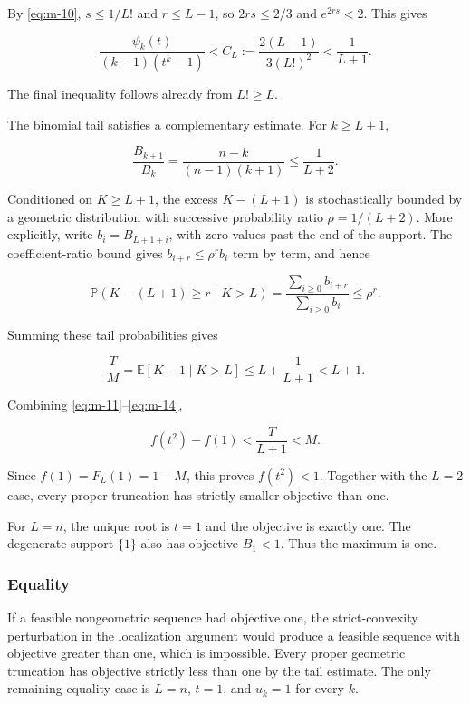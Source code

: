 \documentclass[11pt,a4paper]{article}
\theoremstyle{definition}
\theoremstyle{remark}
\begin{document}
By \eqref{eq:m-10}, \(s\le1/L!\) and \(r\le L-1\), so \(2rs\le2/3\) and
\(e^{2rs}<2\). This gives

\begin{equation}\label{eq:m-13}
\frac{\psi_k(t)}{(k-1)(t^k-1)}
<
C_L:=\frac{2(L-1)}{3(L!)^2}
<
\frac1{L+1}.
\end{equation}

The final inequality follows already from \(L!\ge L\).

The binomial tail satisfies a complementary estimate. For \(k\ge L+1\),

\[
\frac{B_{k+1}}{B_k}
=\frac{n-k}{(n-1)(k+1)}
\le\frac1{L+2}.
\]

Conditioned on \(K\ge L+1\), the excess \(K-(L+1)\) is stochastically
bounded by a geometric distribution with successive probability ratio
\(\rho=1/(L+2)\). More explicitly, write \(b_i=B_{L+1+i}\), with zero
values past the end of the support. The coefficient-ratio bound gives
\(b_{i+r}\le\rho^r b_i\) term by term, and hence

\[
\mathbb P(K-(L+1)\ge r\mid K>L)
=\frac{\sum_{i\ge0}b_{i+r}}{\sum_{i\ge0}b_i}
\le\rho^r.
\]

Summing these tail probabilities gives

\begin{equation}\label{eq:m-14}
\frac TM
=\mathbb E[K-1\mid K>L]
\le L+\frac1{L+1}
<L+1.
\end{equation}

Combining \eqref{eq:m-11}--\eqref{eq:m-14},

\[
f(t^2)-f(1)
<\frac{T}{L+1}
<M.
\]

Since \(f(1)=F_L(1)=1-M\), this proves \(f(t^2)<1\). Together with the
\(L=2\) case, every proper truncation has strictly smaller objective
than one.

For \(L=n\), the unique root is \(t=1\) and the objective is exactly
one. The degenerate support \(\{1\}\) also has objective \(B_1<1\). Thus
the maximum is one.

\subsubsection{Equality}\label{scalar-equality}

If a feasible nongeometric sequence had objective one, the
strict-convexity perturbation in the localization argument would produce
a feasible sequence with objective greater than one, which is
impossible. Every proper geometric truncation has objective strictly
less than one by the tail estimate. The only remaining equality case is
\(L=n\), \(t=1\), and \(u_k=1\) for every \(k\).
\end{document}
